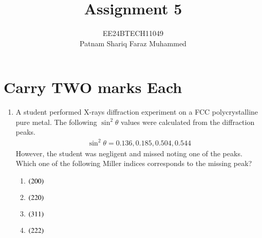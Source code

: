 \documentclass[journal]{IEEEtran}
\numberwithin{equation}{enumi}
\numberwithin{figure}{enumi}
\begin{document}


\title{Assignment 5}
\author{EE24BTECH11049 \\ Patnam Shariq Faraz Muhammed}

{\let\newpage\relax\maketitle}
\section{Carry TWO marks Each}
\begin{enumerate}
	\item A student performed X-rays diffraction experiment on a FCC polycrystalline pure metal. The following $\sin^{2}{\theta}$ values were calculated from the diffraction peaks. 
		\begin{align*}
			\sin^{2}{\theta} = 0.136, 0.185, 0.504, 0.544
		\end{align*}
	However, the student was negligent and missed noting one of the peaks. Which one of the following Miller indices corresponds to the missing peak? 
		
		\begin{multicols}{4}
			\begin{enumerate}
				\item $\left(200\right)$
				\item $\left(220\right)$
				\item $\left(311\right)$
				\item $\left(222\right)$
			\end{enumerate}
		\end{multicols}


\end{enumerate}
\end{document}

